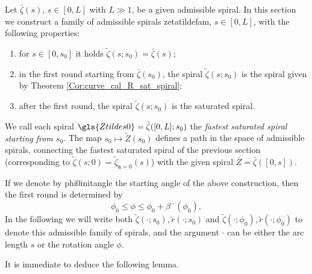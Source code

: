 \documentclass[reqno]{amsart}
\theoremstyle{definition} \newtheorem{definition}{Definition}[section]
\theoremstyle{definition} \newtheorem{remark}[definition]{Remark}
\theoremstyle{plain} \newtheorem{lemma}[definition]{Lemma}
\theoremstyle{plain} \newtheorem{proposition}[definition]{Proposition}
\theoremstyle{plain} \newtheorem{theorem}[definition]{Theorem}
\theoremstyle{plain} \newtheorem{corollary}[definition]{Corollary}
\theoremstyle{definition} \newtheorem{example}[definition]{Example}
\theoremstyle{plain} \newtheorem{claim}[clai]{Claim}
\theoremstyle{definition} \newtheorem{assumption}[definition]{Assumption}
\theoremstyle{definition} \newtheorem{observation}[definition]{Observation}
\newcommand{\1}{\mathbbm 1}
\numberwithin{equation}{section} %
\theoremstyle{plain} \newtheorem*{theorem*}{Theorem}
\theoremstyle{plain} \newtheorem{mthm}[maintheorem]{Main Theorem}
\theoremstyle{plain} \newtheorem*{mthm*}{Main Theorem}
\theoremstyle{plain} \newtheorem*{conjecture*}{Conjecture}
\theoremstyle{plain} \newtheorem{conjecture}[definition]{Conjecture}
\theoremstyle{plain} \newtheorem*{problem*}{Problem}
\begin{document}
Let $\bar \zeta(s)$, $s \in [0,L]$ with $L \gg 1$, be a given admissible spiral. In this section we construct a family of admissible spirals  \gls{zetatildefam}, $s \in [0,L]$, with the following properties:
\begin{enumerate}
\item for $s \in [0,s_0]$ it holds $\tilde \zeta(s;s_0) = \bar \zeta(s)$;
\item in the first round starting from $\bar \zeta(s_0)$, the spiral $\tilde \zeta(s;s_0)$ is the spiral given by Theorem \ref{Cor:curve_cal_R_sat_spiral};
\item after the first round, the spiral $\tilde \zeta(s;s_0)$ is the saturated spiral.
\end{enumerate}
We call each spiral  $\gls{Ztildes0} = \tilde \zeta([0,L];s_0)$ the \emph{fastest saturated spiral starting from $s_0$}. The map $s_0 \mapsto \tilde Z(s_0)$ defines a path in the space of admissible spirals, connecting the fastest saturated spiral of the previous section (corresponding to $\tilde \zeta(s;0) = \tilde \zeta_{\mathtt a = 0}(s)$) with the given spiral $\bar Z = \bar \zeta([0,s])$.

If we denote by  \gls{phi0initangle} the starting angle of the above construction, then the first round is determined by
\begin{equation*}
\phi_0 \leq \phi \leq \phi_0 + \beta^-(\phi_0),
\end{equation*}
In the following we will write both $\tilde \zeta(\cdot;s_0),\tilde r(\cdot;s_0)$ and $\tilde \zeta(\cdot;\phi_0),\tilde r(\cdot;\phi_0)$ to denote this admissible family of spirals, and the argument $\cdot$ can be either the arc length $s$ or the rotation angle $\phi$.

It is immediate to deduce the following lemma.
\end{document}
